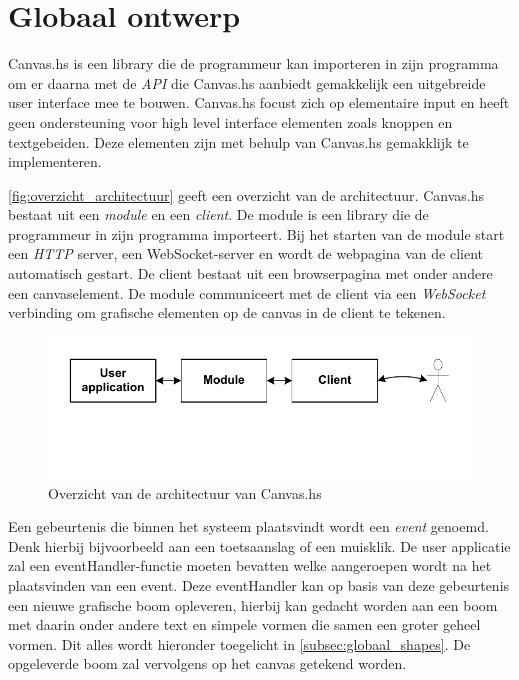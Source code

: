 \section{Globaal ontwerp}  \label{sec:globaal}
Canvas.hs is een library die de programmeur kan importeren in zijn programma om er daarna met de \emph{API} die Canvas.hs aanbiedt gemakkelijk een uitgebreide user interface mee te bouwen. Canvas.hs focust zich op elementaire input en heeft geen ondersteuning voor high level interface elementen zoals knoppen en textgebeiden. Deze elementen zijn met behulp van Canvas.hs gemakklijk te implementeren.

\autoref{fig:overzicht_architectuur} geeft een overzicht van de architectuur. Canvas.hs bestaat uit een \emph{module} en een \emph{client}. De module is een library die de programmeur in zijn programma importeert. Bij het starten van de module start een \emph{HTTP} server, een WebSocket-server en wordt de webpagina van de client automatisch gestart. De client bestaat uit een browserpagina met onder andere een canvaselement. De module communiceert met de client via een \emph{WebSocket} verbinding om grafische elementen op de canvas in de client te tekenen.

\begin{figure}[H]
\begin{center}
\includegraphics[keepaspectratio,width=\textwidth]{./images/architecture_overzicht_poster.pdf}
\caption{Overzicht van de architectuur van Canvas.hs}
\label{fig:overzicht_architectuur}
\end{center}
\end{figure}

Een gebeurtenis die binnen het systeem plaatsvindt wordt een \emph{event} genoemd. Denk hierbij bijvoorbeeld aan een toetsaanslag of een muisklik. De user applicatie zal een eventHandler-functie moeten bevatten welke aangeroepen wordt na het plaatsvinden van een event. Deze eventHandler kan op basis van deze gebeurtenis een nieuwe grafische boom opleveren, hierbij kan gedacht worden aan een boom met daarin onder andere text en simpele vormen die samen een groter geheel vormen. Dit alles wordt hieronder toegelicht in \autoref{subsec:globaal_shapes}. De opgeleverde boom zal vervolgens op het canvas getekend worden. 

